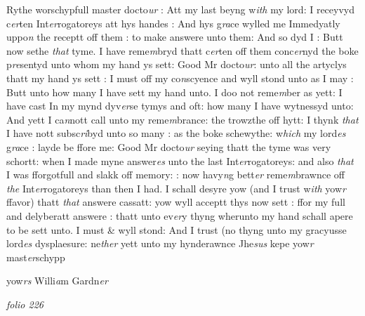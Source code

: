 \documentclass[12pt, a4paper]{book}
\begin{document}
		\ifthenelse{\isodd{\thepage}}
		{\reversemarginpar}
		{\normalmarginpar}
		Rythe worschypfull master docto\textit{ur} : Att my last beyng 
w\textit{ith} my lord: I receyvyd c\textit{er}ten Int\textit{er}rogatoreys att hys 
handes : And hys g\textit{ra}ce wylled me Immedyatly uppo\textit{n} the
receptt off them : to make answere unto them: And 
so dyd I : Butt now sethe\textit{ that} tyme. I have reme\textit{m}bryd
thatt c\textit{er}ten off them conc\textit{er}nyd the boke p\textit{re}sentyd unto
whom my hand ys sett: Good Mr docto\textit{ur}: unto all the 
artyclys thatt my hand ys sett : I must off my co\textit{n}scyence
and wyll stond unto as I may
			: Butt unto how many I have 
sett my hand unto. I doo not reme\textit{m}ber as yett: I 
have cast In my mynd dyv\textit{er}se tymys and oft: how many 
I have wytnessyd unto: And yett I ca\textit{n}nott call unto my 
reme\textit{m}brance: the trowzthe off hytt: I thynk \textit{that} I have nott
subsc\textit{ri}byd unto so many : as the boke schewythe: w\textit{hich} my
lord\textit{es} g\textit{ra}ce : layde be ffore me: Good Mr docto\textit{ur} seying thatt
the tyme was very schortt: when I made myne answer\textit{es} unto
the last Int\textit{er}rogatoreys: and also \textit{that} I was fforgotfull and slakk
off memory: : now havy\textit{n}g bett\textit{er} reme\textit{m}brawnce off \textit{the} Int\textit{er}rogatoreys
than then I had. I schall desyre yow (and I trust w\textit{ith}
yow\textit{r} ffavor) thatt \textit{that} answere cassatt: yow wyll acceptt thys
now sett : ffor my full and delyberatt answere : thatt
unto ev\textit{er}y thyng wherunto my hand schall apere to be sett
unto. I must \& wyll stond: And I trust (no thyng unto 
	my gracyusse lord\textit{es} dysplaesure: ne\textit{ther} yett unto my hynderawnce
	Jhe\textit{sus} kepe yow\textit{r} mast\textit{er}schypp 

		\ifthenelse{\isodd{\thepage}}
		{\reversemarginpar}
		{\normalmarginpar}
		yow\textit{rs} Willi\textit{a}m
Gardn\textit{er}

               
\dotfill
						\newpage
{}

\textit{folio 226}


         \vspace*{4cm}
         
\dotfill
						  \section*{}  \subsection*{}
\end{document}
